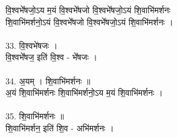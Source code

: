 वि॒श्वभे᳚षजो॒ऽय म॒यं वि॒श्वभे᳚षजो वि॒श्वभे᳚षजो॒ऽयं शि॒वाभि॑मर्शनः\\
शि॒वाभि॑मर्शनो॒ऽयं वि॒श्वभे᳚षजो वि॒श्वभे᳚षजो॒ऽयं शि॒वाभि॑मर्शनः ।\\
\\
33. वि॒श्वभे॑षजः ।\\
वि॒श्वभे᳚षज॒ इति॑ वि॒श्व - भे᳚षजः ।\\
\\
34. अ॒यम् । शि॒वाभि॑मर्शनः ॥\\
अ॒यं शि॒वाभि॑मर्शनः शि॒वाभि॑मर्शनो॒ऽय म॒यं शि॒वाभि॑मर्शनः ।\\
\\
35. शि॒वाभि॑मर्शनः ॥\\
शि॒वाभि॑मर्शन॒ इति॑ शि॒व - अभि॑मर्शनः ।\\

